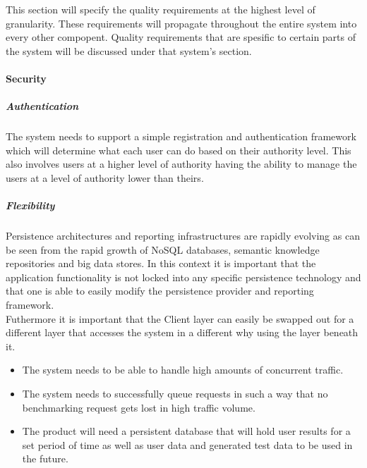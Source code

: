 This section will specify the quality requirements at the highest level of
granularity. These requirements will propagate throughout the entire system
into every other compopent. Quality requirements that are spesific to certain
parts of the system will be discussed under that system's section.
\paragraph{Security}
\subparagraph{Authentication}
The system needs to support a simple registration and authentication framework
which will determine what each user can do based on their authority level. This
also involves users at a higher level of authority having the ability to manage
the users at a level of authority lower than theirs.
\subparagraph{Flexibility}
Persistence architectures and reporting infrastructures are rapidly evolving as can
be seen from the rapid growth of NoSQL databases, semantic knowledge repositories and big data
stores. In this context it is important that the application functionality is not locked into any
specific persistence technology and that one is able to easily modify the persistence provider and
reporting framework.\\
Futhermore it is important that the Client layer can easily be swapped out for a different
layer that accesses the system in a different why using the layer beneath it.
\begin{itemize}
 \item The system needs to be able to handle high amounts of concurrent traffic.
 \item The system needs to successfully queue requests in such a way that no
	   benchmarking request gets lost in high traffic volume.
 \item The product will need a persistent database that will hold user results
       for a set period of time as well as user data and generated test data to
       be used in the future. 
\end{itemize}
